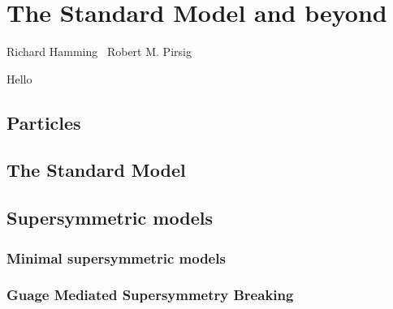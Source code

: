 \chapter{The Standard Model and beyond}
\label{chapter:theory}

\begin{epigraphs}
%
{Richard Hamming~\cite{hamming1980unreasonable}}
%
{Robert M. Pirsig~\cite{pirsig1999zen}}
\end{epigraphs}



Hello

\section{Particles}

\section{The Standard Model}

\section{Supersymmetric models}

\subsection{Minimal supersymmetric models}

\subsection{Guage Mediated Supersymmetry Breaking}

